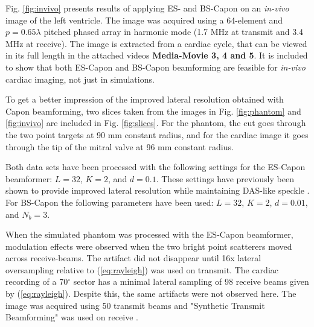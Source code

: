 \documentclass[journal]{IEEEtran}
\newcommand{\degree}{\ensuremath{^\circ}}
\newcommand\multimedia[1]{\textbf{{\color{red}#1}}}
\begin{document}
Fig. \ref{fig:invivo} presents results of applying ES- and BS-Capon on an \textit{in-vivo} image of the left ventricle. The image was acquired using a 64-element and $p=0.65\lambda$ pitched phased array in harmonic mode (1.7 MHz at transmit and 3.4 MHz at receive). The image is extracted from a cardiac cycle, that can be viewed in its full length in the attached videos \multimedia{Media-Movie 3, 4 and 5}. It is included to show that both ES-Capon and BS-Capon beamforming are feasible for \textit{in-vivo} cardiac imaging, not just in simulations.

To get a better impression of the improved lateral resolution obtained with Capon beamforming, two slices taken from the images in Fig. \ref{fig:phantom} and \ref{fig:invivo} are included in Fig. \ref{fig:slices}. For the phantom, the cut goes through the two point targets at 90 mm constant radius, and for the cardiac image it goes through the tip of the mitral valve at 96 mm constant radius.

Both data sets have been processed with the following settings for the ES-Capon beamformer: $L = 32$, $K = 2$, and $d=0.1$. These settings have previously been shown to provide improved lateral resolution while maintaining DAS-like speckle \cite{Synnevag2007a}. For BS-Capon the following parameters have been used: $L=32$, $K=2$, $d=0.01$, and $N_b=3$. 

When the simulated phantom was processed with the ES-Capon beamformer, modulation effects were observed when the two bright point scatterers moved across receive-beams. The artifact did not disappear until 16x lateral oversampling relative to (\ref{eq:rayleigh}) was used on transmit. The cardiac recording of a 70\degree{} sector has a minimal lateral sampling of 98 receive beams given by (\ref{eq:rayleigh}). Despite this, the same artifacts were not observed here. The image was acquired using 50 transmit beams and "Synthetic Transmit Beamforming" was used on receive \cite{Hergum2007}. 
\end{document}
